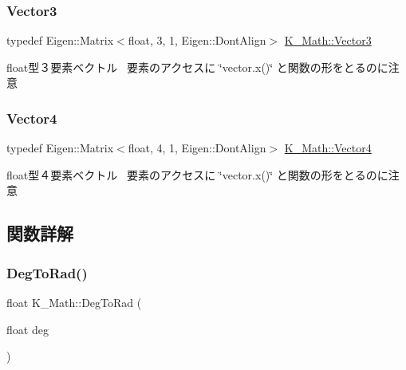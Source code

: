 \subsubsection{\texorpdfstring{Vector3}{Vector3}}
{\footnotesize\ttfamily typedef Eigen\+::\+Matrix$<$float, 3, 1, Eigen\+::\+Dont\+Align$>$ \mbox{\hyperlink{namespace_k___math_a66884d78082c39ada4091c211f3570f8}{K\+\_\+\+Math\+::\+Vector3}}}



float型３要素ベクトル~\newline
要素のアクセスに \char`\"{}vector.\+x()\char`\"{} と関数の形をとるのに注意 

\mbox{\label{namespace_k___math_a8d82de9de17eae460600de1e40e8a01f}} 
\subsubsection{\texorpdfstring{Vector4}{Vector4}}
{\footnotesize\ttfamily typedef Eigen\+::\+Matrix$<$float, 4, 1, Eigen\+::\+Dont\+Align$>$ \mbox{\hyperlink{namespace_k___math_a8d82de9de17eae460600de1e40e8a01f}{K\+\_\+\+Math\+::\+Vector4}}}



float型４要素ベクトル~\newline
要素のアクセスに \char`\"{}vector.\+x()\char`\"{} と関数の形をとるのに注意 



\subsection{関数詳解}
\mbox{\label{namespace_k___math_a51746a69b3cdedea6ac164f799600c98}} 
\subsubsection{\texorpdfstring{Deg\+To\+Rad()}{DegToRad()}}
{\footnotesize\ttfamily float K\+\_\+\+Math\+::\+Deg\+To\+Rad (\begin{DoxyParamCaption}\item[{float}]{deg }\end{DoxyParamCaption})}



